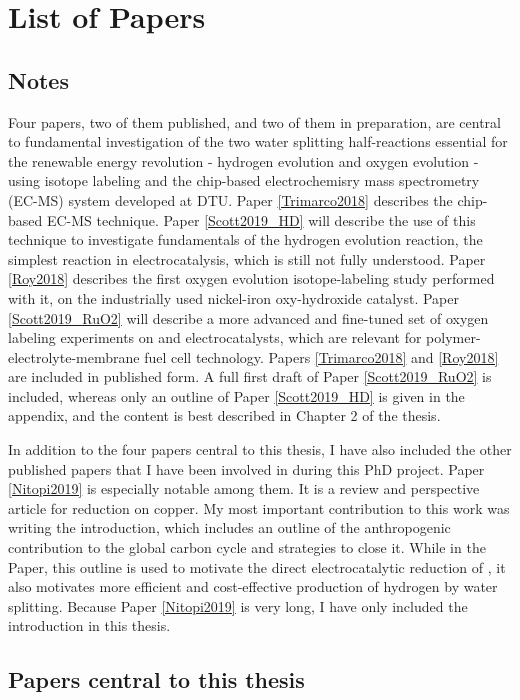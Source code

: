 \section*{List of Papers}

\subsection*{Notes}
Four papers, two of them published, and two of them in preparation, are central to fundamental investigation of the two water splitting half-reactions essential for the renewable energy revolution - hydrogen evolution and oxygen evolution - using isotope labeling and the chip-based electrochemisry mass spectrometry (EC-MS) system developed at DTU. Paper \ref{Trimarco2018} describes the chip-based EC-MS technique. Paper \ref{Scott2019_HD} will describe the use of this technique to investigate fundamentals of the hydrogen evolution reaction, the simplest reaction in electrocatalysis, which is still not fully understood. Paper \ref{Roy2018} describes the first oxygen evolution isotope-labeling study performed with it, on the industrially used nickel-iron oxy-hydroxide catalyst. Paper \ref{Scott2019_RuO2} will describe a more advanced and fine-tuned set of oxygen labeling experiments on  and  electrocatalysts, which are relevant for polymer-electrolyte-membrane fuel cell technology. Papers \ref{Trimarco2018} and \ref{Roy2018} are included in published form. A full first draft of Paper \ref{Scott2019_RuO2} is included, whereas only an outline of Paper \ref{Scott2019_HD} is given in the appendix, and the content is best described in Chapter 2 of the thesis.

In addition to the four papers central to this thesis, I have also included the other published papers that I have been involved in during this PhD project. Paper \ref{Nitopi2019} is especially notable among them. It is a review and perspective article for  reduction on copper. My most important contribution to this work was writing the introduction, which includes an outline of the anthropogenic contribution to the global carbon cycle and strategies to close it. While in the Paper, this outline is used to motivate the direct electrocatalytic reduction of , it also motivates more efficient and cost-effective production of hydrogen by water splitting. Because Paper \ref{Nitopi2019} is very long, I have only included the introduction in this thesis.

\subsection*{Papers central to this thesis}
\parindent=0pt

